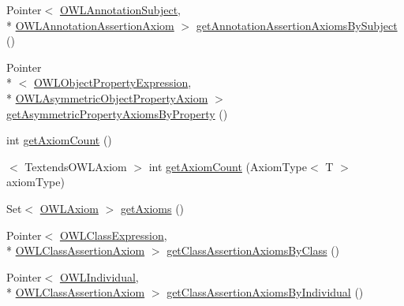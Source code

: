 \begin{DoxyCompactItemize}
\item 
Pointer$<$ \hyperlink{interfaceorg_1_1semanticweb_1_1owlapi_1_1model_1_1_o_w_l_annotation_subject}{O\-W\-L\-Annotation\-Subject}, \\*
\hyperlink{interfaceorg_1_1semanticweb_1_1owlapi_1_1model_1_1_o_w_l_annotation_assertion_axiom}{O\-W\-L\-Annotation\-Assertion\-Axiom} $>$ \hyperlink{interfaceuk_1_1ac_1_1manchester_1_1cs_1_1owl_1_1owlapi_1_1_internals_ad0e0ba6870a4acf8028e5b425be41cd2}{get\-Annotation\-Assertion\-Axioms\-By\-Subject} ()
\item 
Pointer\\*
$<$ \hyperlink{interfaceorg_1_1semanticweb_1_1owlapi_1_1model_1_1_o_w_l_object_property_expression}{O\-W\-L\-Object\-Property\-Expression}, \\*
\hyperlink{interfaceorg_1_1semanticweb_1_1owlapi_1_1model_1_1_o_w_l_asymmetric_object_property_axiom}{O\-W\-L\-Asymmetric\-Object\-Property\-Axiom} $>$ \hyperlink{interfaceuk_1_1ac_1_1manchester_1_1cs_1_1owl_1_1owlapi_1_1_internals_a60cbaeb33d35d7368f04fb4f0d02357f}{get\-Asymmetric\-Property\-Axioms\-By\-Property} ()
\item 
int \hyperlink{interfaceuk_1_1ac_1_1manchester_1_1cs_1_1owl_1_1owlapi_1_1_internals_a6b98ad0b5e89929e62d71884b1b8a16c}{get\-Axiom\-Count} ()
\item 
$<$ Textends\-O\-W\-L\-Axiom $>$ int \hyperlink{interfaceuk_1_1ac_1_1manchester_1_1cs_1_1owl_1_1owlapi_1_1_internals_a101464ac64598cbbd6be7d7401748932}{get\-Axiom\-Count} (Axiom\-Type$<$ T $>$ axiom\-Type)
\item 
Set$<$ \hyperlink{interfaceorg_1_1semanticweb_1_1owlapi_1_1model_1_1_o_w_l_axiom}{O\-W\-L\-Axiom} $>$ \hyperlink{interfaceuk_1_1ac_1_1manchester_1_1cs_1_1owl_1_1owlapi_1_1_internals_aca6cef549444ab5c9427a673e8c93de6}{get\-Axioms} ()
\item 
Pointer$<$ \hyperlink{interfaceorg_1_1semanticweb_1_1owlapi_1_1model_1_1_o_w_l_class_expression}{O\-W\-L\-Class\-Expression}, \\*
\hyperlink{interfaceorg_1_1semanticweb_1_1owlapi_1_1model_1_1_o_w_l_class_assertion_axiom}{O\-W\-L\-Class\-Assertion\-Axiom} $>$ \hyperlink{interfaceuk_1_1ac_1_1manchester_1_1cs_1_1owl_1_1owlapi_1_1_internals_aac75f647b69006aab86f1984c911f820}{get\-Class\-Assertion\-Axioms\-By\-Class} ()
\item 
Pointer$<$ \hyperlink{interfaceorg_1_1semanticweb_1_1owlapi_1_1model_1_1_o_w_l_individual}{O\-W\-L\-Individual}, \\*
\hyperlink{interfaceorg_1_1semanticweb_1_1owlapi_1_1model_1_1_o_w_l_class_assertion_axiom}{O\-W\-L\-Class\-Assertion\-Axiom} $>$ \hyperlink{interfaceuk_1_1ac_1_1manchester_1_1cs_1_1owl_1_1owlapi_1_1_internals_a6a803cd2aaf8e94db46919c2445d5222}{get\-Class\-Assertion\-Axioms\-By\-Individual} ()

\end{DoxyCompactItemize}
